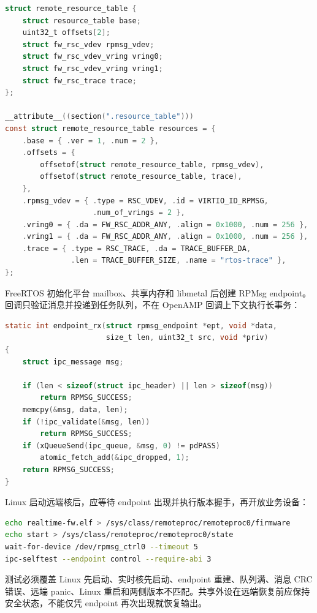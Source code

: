 \begin{lstlisting}[language=C,caption={远端固件 resource table 结构（简化）}]
struct remote_resource_table {
    struct resource_table base;
    uint32_t offsets[2];
    struct fw_rsc_vdev rpmsg_vdev;
    struct fw_rsc_vdev_vring vring0;
    struct fw_rsc_vdev_vring vring1;
    struct fw_rsc_trace trace;
};

__attribute__((section(".resource_table")))
const struct remote_resource_table resources = {
    .base = { .ver = 1, .num = 2 },
    .offsets = {
        offsetof(struct remote_resource_table, rpmsg_vdev),
        offsetof(struct remote_resource_table, trace),
    },
    .rpmsg_vdev = { .type = RSC_VDEV, .id = VIRTIO_ID_RPMSG,
                    .num_of_vrings = 2 },
    .vring0 = { .da = FW_RSC_ADDR_ANY, .align = 0x1000, .num = 256 },
    .vring1 = { .da = FW_RSC_ADDR_ANY, .align = 0x1000, .num = 256 },
    .trace = { .type = RSC_TRACE, .da = TRACE_BUFFER_DA,
               .len = TRACE_BUFFER_SIZE, .name = "rtos-trace" },
};
\end{lstlisting}

FreeRTOS 初始化平台 mailbox、共享内存和 libmetal 后创建 RPMsg endpoint。回调只验证消息并投递到任务队列，不在 OpenAMP 回调上下文执行长事务：

\begin{lstlisting}[language=C,caption={FreeRTOS 端 RPMsg 接收边界}]
static int endpoint_rx(struct rpmsg_endpoint *ept, void *data,
                       size_t len, uint32_t src, void *priv)
{
    struct ipc_message msg;

    if (len < sizeof(struct ipc_header) || len > sizeof(msg))
        return RPMSG_SUCCESS;
    memcpy(&msg, data, len);
    if (!ipc_validate(&msg, len))
        return RPMSG_SUCCESS;
    if (xQueueSend(ipc_queue, &msg, 0) != pdPASS)
        atomic_fetch_add(&ipc_dropped, 1);
    return RPMSG_SUCCESS;
}
\end{lstlisting}

Linux 启动远端核后，应等待 endpoint 出现并执行版本握手，再开放业务设备：

\begin{lstlisting}[language=bash,caption={Linux 侧启动与握手检查（示意）}]
echo realtime-fw.elf > /sys/class/remoteproc/remoteproc0/firmware
echo start > /sys/class/remoteproc/remoteproc0/state
wait-for-device /dev/rpmsg_ctrl0 --timeout 5
ipc-selftest --endpoint control --require-abi 3
\end{lstlisting}

测试必须覆盖 Linux 先启动、实时核先启动、endpoint 重建、队列满、消息 CRC 错误、远端 panic、Linux 重启和两侧版本不匹配。共享外设在远端恢复前应保持安全状态，不能仅凭 endpoint 再次出现就恢复输出。

